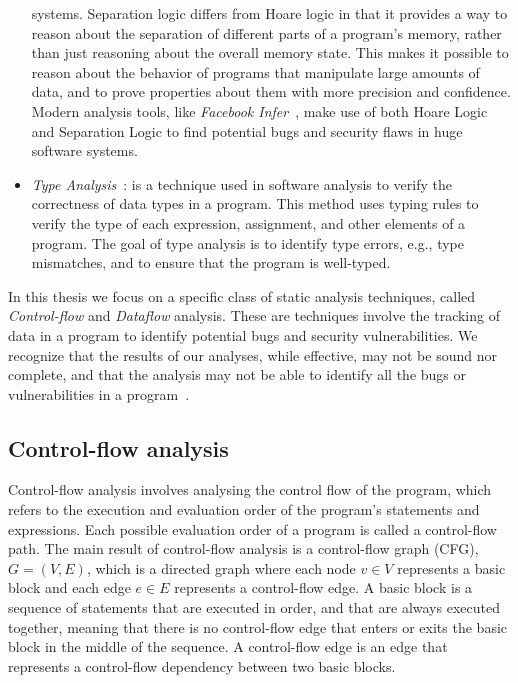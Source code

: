 \begin{itemize}
  systems. Separation logic differs from Hoare logic in that it provides a way to
  reason about the separation of different parts of a program's memory, rather
  than just reasoning about the overall memory state. This makes it possible to
  reason about the behavior of programs that manipulate large amounts of data, and
  to prove properties about them with more precision and confidence.
  Modern analysis tools, like \emph{Facebook Infer}~\cite{calcagno2011infer},
  make use of both Hoare Logic and Separation Logic to find potential bugs
  and security flaws in huge software systems.
  \item \emph{Type Analysis}~\cite{pierce2002types}: is a technique used in software analysis to verify
  the correctness of data types in a program. This method uses typing rules to verify
  the type of each expression, assignment, and other elements of a program.
  The goal of type analysis is to identify type errors, e.g., type mismatches,
  and to ensure that the program is well-typed.
\end{itemize}
In this thesis we focus on a specific class of static analysis techniques,
called \emph{Control-flow} and \emph{Dataflow} analysis. These are techniques involve the
tracking of data in a program to identify potential bugs and security vulnerabilities.
We recognize that the results of our analyses, while effective,
may not be sound nor complete, and that the analysis may not be able to identify
all the bugs or vulnerabilities in a program~\cite{livshits2015defense}.

\subsection{Control-flow analysis}
Control-flow analysis involves analysing the control flow of the program, which refers
to the execution and evaluation order of the program's statements and expressions.
Each possible evaluation order of a program is called a control-flow path.
The main result of control-flow analysis is a control-flow graph (CFG), $G = (V, E)$, 
which is a directed graph where each node $v \in V$ represents a basic block
and each edge $e \in E$ represents a control-flow edge. A basic block is a sequence of
statements that are executed in order, and that are always executed together, meaning
that there is no control-flow edge that enters or exits the basic block in the middle of the sequence.
A control-flow edge is an edge that represents a control-flow dependency between two basic blocks.

